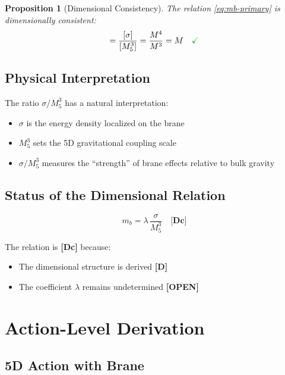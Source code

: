 \documentclass[11pt,a4paper]{article}
\newcommand{\Mfive}{M_5}
\newcommand{\mb}{m_b}
\newcommand{\tagD}{\textbf{[D]}}
\newcommand{\tagDc}{\textbf{[Dc]}}
\newcommand{\tagOPEN}{\textbf{[OPEN]}}
\newcommand{\emark}{\textcolor{green!70!black}{\checkmark}}
\theoremstyle{definition}
\theoremstyle{plain}
\newtheorem{proposition}{Proposition}[section]
\theoremstyle{remark}
\begin{document}
\begin{proposition}[Dimensional Consistency]
\label{prop:dim-consistency}
The relation \cref{eq:mb-primary} is dimensionally consistent:
\begin{equation}
[\mb] = \frac{[\sigma]}{[\Mfive^3]} = \frac{M^4}{M^3} = M \quad \emark
\label{eq:dim-check}
\end{equation}
\end{proposition}

\subsection{Physical Interpretation}

The ratio $\sigma/\Mfive^3$ has a natural interpretation:
\begin{itemize}
\item $\sigma$ is the energy density localized on the brane
\item $\Mfive^3$ sets the 5D gravitational coupling scale
\item $\sigma/\Mfive^3$ measures the ``strength'' of brane effects relative to bulk gravity
\end{itemize}

\subsection{Status of the Dimensional Relation}

\begin{equation}
\mb = \lambda \, \frac{\sigma}{\Mfive^3} \quad \tagDc{}
\label{eq:mb-status}
\end{equation}

The relation is \tagDc{} because:
\begin{itemize}
\item The dimensional structure is derived \tagD{}
\item The coefficient $\lambda$ remains undetermined \tagOPEN{}
\end{itemize}

\section{Action-Level Derivation}
\label{sec:action}

\subsection{5D Action with Brane}
\end{document}
